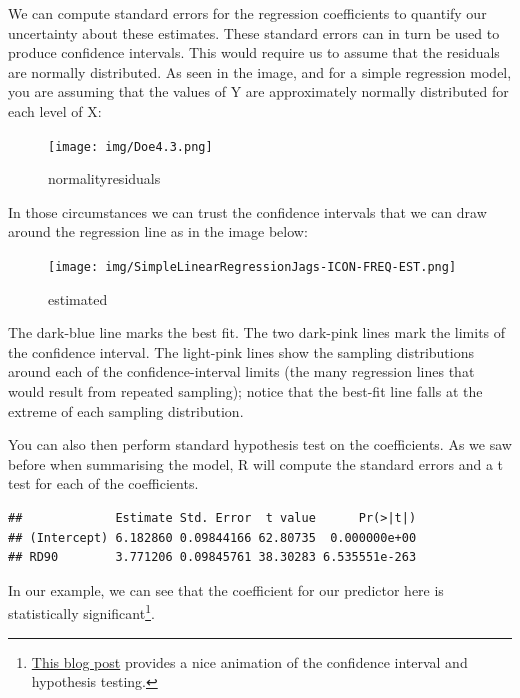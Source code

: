 \documentclass[]{book}
\newenvironment{Shaded}{\begin{snugshade}}{\end{snugshade}}
\newcommand{\DecValTok}[1]{\textcolor[rgb]{0.00,0.00,0.81}{#1}}
\newcommand{\KeywordTok}[1]{\textcolor[rgb]{0.13,0.29,0.53}{\textbf{#1}}}
\newcommand{\NormalTok}[1]{#1}
\newcommand{\OperatorTok}[1]{\textcolor[rgb]{0.81,0.36,0.00}{\textbf{#1}}}
\begin{document}
We can compute standard errors for the regression coefficients to quantify our uncertainty about these estimates. These standard errors can in turn be used to produce confidence intervals. This would require us to assume that the residuals are normally distributed. As seen in the image, and for a simple regression model, you are assuming that the values of Y are approximately normally distributed for each level of X:

\begin{figure}
\centering
\texttt{[image: img/Doe4.3.png]}
\caption{normalityresiduals}
\end{figure}

In those circumstances we can trust the confidence intervals that we can draw around the regression line as in the image below:

\begin{figure}
\centering
\texttt{[image: img/SimpleLinearRegressionJags-ICON-FREQ-EST.png]}
\caption{estimated}
\end{figure}

The dark-blue line marks the best fit. The two dark-pink lines mark the limits of the confidence interval. The light-pink lines show the sampling distributions around each of the confidence-interval limits (the many regression lines that would result from repeated sampling); notice that the best-fit line falls at the extreme of each sampling distribution.

You can also then perform standard hypothesis test on the coefficients. As we saw before when summarising the model, R will compute the standard errors and a t test for each of the coefficients.

\begin{Shaded}
\end{Shaded}

\begin{verbatim}
##             Estimate Std. Error  t value      Pr(>|t|)
## (Intercept) 6.182860 0.09844166 62.80735  0.000000e+00
## RD90        3.771206 0.09845761 38.30283 6.535551e-263
\end{verbatim}

In our example, we can see that the coefficient for our predictor here is statistically significant\footnote{\href{http://www.sumsar.net/blog/2013/12/an-animation-of-the-construction-of-a-confidence-interval/}{This blog post} provides a nice animation of the confidence interval and hypothesis testing.}.
\end{document}
